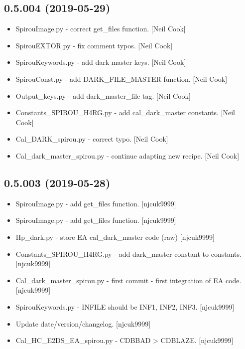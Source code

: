 \documentclass[a4paper,10pt,english]{report}
\begin{document}
\subsection{0.5.004 (2019-05-29)}
\label{\detokenize{misc/changelog:id131}}\begin{itemize}
\item {} 
SpirouImage.py - correct get\_files function. {[}Neil Cook{]}

\item {} 
SpirouEXTOR.py - fix comment typos. {[}Neil Cook{]}

\item {} 
SpirouKeywords.py - add dark master keys. {[}Neil Cook{]}

\item {} 
SpirouConst.py - add DARK\_FILE\_MASTER function. {[}Neil Cook{]}

\item {} 
Output\_keys.py - add dark\_master\_file tag. {[}Neil Cook{]}

\item {} 
Constants\_SPIROU\_H4RG.py - add cal\_dark\_master constants. {[}Neil Cook{]}

\item {} 
Cal\_DARK\_spirou.py - correct typo. {[}Neil Cook{]}

\item {} 
Cal\_dark\_master\_spirou.py - continue adapting new recipe. {[}Neil Cook{]}

\end{itemize}


\subsection{0.5.003 (2019-05-28)}
\label{\detokenize{misc/changelog:id132}}\begin{itemize}
\item {} 
SpirouImage.py - add get\_files function. {[}njcuk9999{]}

\item {} 
SpirouImage.py - add get\_files function. {[}njcuk9999{]}

\item {} 
Hp\_dark.py - store EA cal\_dark\_master code (raw) {[}njcuk9999{]}

\item {} 
Constants\_SPIROU\_H4RG.py - add dark\_master constant to constants.
{[}njcuk9999{]}

\item {} 
Cal\_dark\_master\_spirou.py - first commit - first integration of EA
code. {[}njcuk9999{]}

\item {} 
SpirouKeywords.py - INFILE should be INF1, INF2, INF3. {[}njcuk9999{]}

\item {} 
Update date/version/changelog. {[}njcuk9999{]}

\item {} 
Cal\_HC\_E2DS\_EA\_spirou.py - CDBBAD \textendash{}\textgreater{} CDBLAZE. {[}njcuk9999{]}

\end{itemize}
\end{document}
